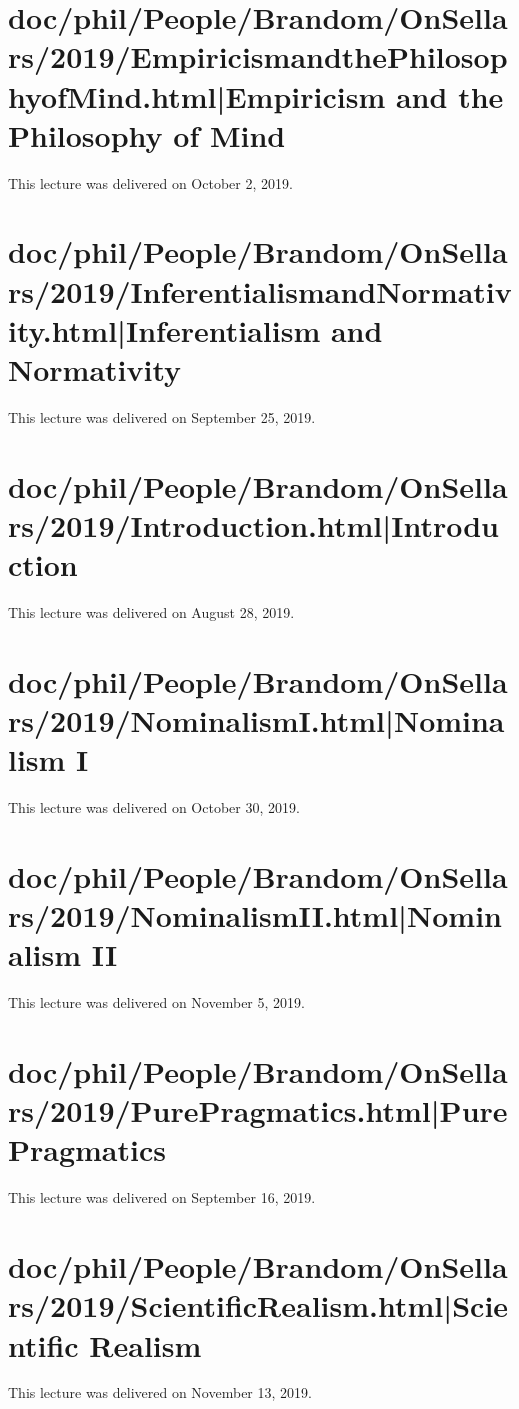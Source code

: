 \documentclass[12pt,a4paper]{report}
\begin{document}
\section{doc/phil/People/Brandom/OnSellars/2019/EmpiricismandthePhilosophyofMind.html|Empiricism and the Philosophy of Mind}
This lecture was delivered on October 2, 2019.

\section{doc/phil/People/Brandom/OnSellars/2019/InferentialismandNormativity.html|Inferentialism and Normativity}
This lecture was delivered on September 25, 2019.

\section{doc/phil/People/Brandom/OnSellars/2019/Introduction.html|Introduction}
This lecture was delivered on August 28, 2019.

\section{doc/phil/People/Brandom/OnSellars/2019/NominalismI.html|Nominalism I}
This lecture was delivered on October 30, 2019.

\section{doc/phil/People/Brandom/OnSellars/2019/NominalismII.html|Nominalism II}
This lecture was delivered on November 5, 2019.

\section{doc/phil/People/Brandom/OnSellars/2019/PurePragmatics.html|Pure Pragmatics}
This lecture was delivered on September 16, 2019.

\section{doc/phil/People/Brandom/OnSellars/2019/ScientificRealism.html|Scientific Realism}
This lecture was delivered on November 13, 2019.
\end{document}
